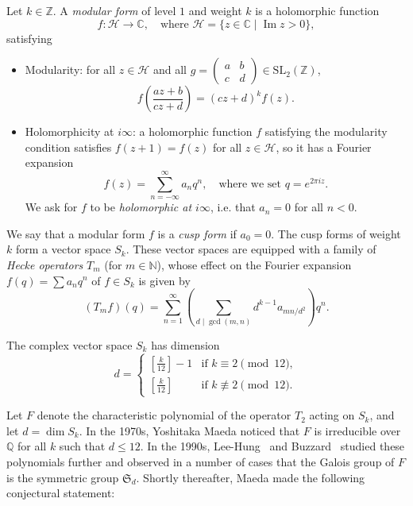 \documentclass[11pt]{article}
\theoremstyle{plain}
\theoremstyle{definition}
\theoremstyle{remark}
\numberwithin{equation}{section}
\newcommand{\longto}{\longrightarrow}
\newcommand{\CC}{\mathbb{C}}
\newcommand{\ZZ}{\mathbb{Z}}
\newcommand{\QQ}{\mathbb{Q}}
\newcommand{\NN}{\mathbb{N}}
\newcommand{\cH}{\mathcal{H}}
\renewcommand{\SS}{\mathfrak{S}}
\renewcommand{\Im}{\operatorname{Im}}
\newcommand{\SL}{\mathrm{SL}}
\begin{document}
Let $k\in\ZZ$.  A \emph{modular form} of level $1$ and weight $k$ is a
holomorphic function
\begin{equation*}
  f\colon\cH\longto\CC, \quad\text{where }
  \cH=\{z\in\CC\mid \Im z>0\},
\end{equation*}
satisfying
\begin{itemize}
  \item Modularity: for all $z\in\cH$ and all
    $g=\left(\begin{smallmatrix}a&b\\c&d\end{smallmatrix}\right)\in\SL_2(\ZZ)$,
      \begin{equation*}
        f\left(\frac{az+b}{cz+d}\right)=(cz+d)^kf(z).
      \end{equation*}
  \item Holomorphicity at $i\infty$: a holomorphic function $f$ satisfying the
    modularity condition satisfies $f(z+1)=f(z)$ for all $z\in\cH$, so it has
    a Fourier expansion
    \begin{equation*}
      f(z)=\sum_{n=-\infty}^\infty a_nq^n,\quad\text{where we set }
      q=e^{2\pi i z}.
    \end{equation*}
    We ask for $f$ to be \emph{holomorphic at $i\infty$}, i.e. that $a_n=0$
    for all $n<0$.
\end{itemize}

We say that a modular form $f$ is a \emph{cusp form} if $a_0=0$.  The cusp
forms of weight $k$ form a vector space $S_k$.  These vector spaces are
equipped with a family of \emph{Hecke operators} $T_m$ (for $m\in\NN$), whose
effect on the Fourier expansion $f(q)=\sum a_nq^n$ of $f\in S_k$ is given by
\begin{equation*}
  (T_m f)(q)=\sum_{n=1}^\infty \left(\sum_{d\mid\gcd(m,n)}d^{k-1}a_{mn/d^2}\right)q^n.
\end{equation*}

The complex vector space $S_k$ has dimension 
\begin{equation*}
  d=\begin{cases}
    \left[\frac{k}{12}\right]-1 & \text{if }k\equiv 2\pmod{12},\\
    \left[\frac{k}{12}\right] & \text{if }k\not\equiv 2\pmod{12}.
  \end{cases}
\end{equation*}

Let $F$ denote the characteristic polynomial of the operator $T_2$ acting on
$S_k$, and let $d=\dim S_k$.
In the 1970s, Yoshitaka Maeda noticed that $F$ is irreducible over $\QQ$ for
all $k$ such that $d\leq 12$.  In the 1990s, Lee-Hung~\cite{LeeHung} and
Buzzard~\cite{Buzzard} studied these polynomials further and observed in a
number of cases that the Galois group of $F$ is the symmetric group
$\SS_d$.  Shortly thereafter, Maeda made the following conjectural statement:
\end{document}
